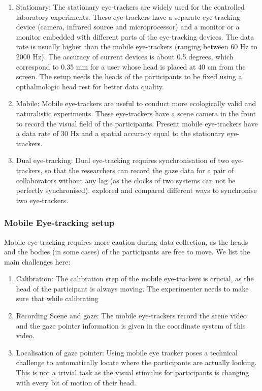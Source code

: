 \documentclass{sig-alternate}
\begin{document}
\begin{enumerate}
\item Stationary: The stationary eye-trackers are widely used for the controlled laboratory experiments. These eye-trackers have a separate eye-tracking device (camera, infrared source and microprocessor) and a monitor or a monitor embedded with different parts  of the eye-tracking devices. The data rate is usually higher than the mobile eye-trackers (ranging between 60 Hz to 2000 Hz). The accuracy of current devices is about 0.5 degrees, which correspond to 0.35 mm for a user whose head is placed at 40 cm from the screen.  The setup needs the heads of the participants to be fixed using a opthalmologic head rest for better data quality. 

\item Mobile: Mobile eye-trackers are useful to conduct more ecologically valid and naturalistic experiments. These eye-trackers have a scene camera in the front to record the visual field of the participants. Present mobile eye-trackers have a data rate of 30 Hz and a spatial accuracy equal to the stationary eye-trackers.

\item Dual eye-tracking: Dual eye-tracking requires synchronisation of two eye-trackers, so that the researchers can record the gaze data for a pair of collaborators without any lag (as the clocks of two systems can not be perfectly synchronised). \cite{nussli2011dual} explored and compared different ways to synchronise two eye-trackers.

\end {enumerate}


\subsubsection{Mobile Eye-tracking setup}

Mobile eye-tracking requires more caution during data collection, as the heads and the bodies (in some cases) of the participants are free to move. We list the main challenges here:

\begin{enumerate}
\item Calibration: The calibration step of the mobile eye-trackers is crucial, as the head of the participant is always moving. The experimenter needs to make sure that while calibrating 
\item Recording Scene and gaze: The mobile eye-trackers record the scene video and the gaze pointer information is given in the coordinate system of this video.
\item Localisation of gaze pointer:  Using mobile eye tracker poses a technical challenge to automatically locate where the participants are actually looking. This is not a trivial task as the visual stimulus for participants is changing with every bit of motion of their head. 

\end {enumerate}
\end{document}
